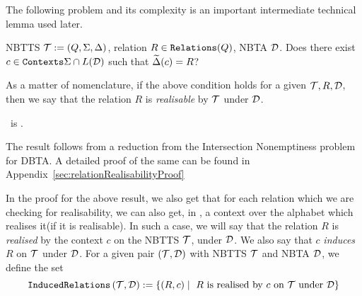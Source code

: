 The following problem and its complexity is an important intermediate technical lemma used later.

\probdef{\relationRealisabilityFull}{\relationRealisabilityShort}
{NBTTS $\mathcal{T} := (Q, \Sigma, \Delta)$, relation $R \in \texttt{Relations}(Q)$, NBTA $\mathcal{D}$.}
{Does there exist $c \in \texttt{Contexts}{\Sigma}{} \cap L(\mathcal{D})$ such that $\widetilde{\Delta}(c) = R$?}

As a matter of nomenclature, if the above condition holds for a given $\mathcal{T}, R, \mathcal{D}$, then we say that the relation $R$ is \emph{realisable} by $\mathcal{T}$ under $\mathcal{D}$.

\begin{theorem}\label{thm:relationRealisabilityExptc}
    \textsc{\relationRealisabilityFull}\ is \exptc.
\end{theorem}

The result follows from a reduction from the Intersection Nonemptiness problem for DBTA. A detailed proof of the same can be found in Appendix~\ref{sec:relationRealisabilityProof}

In the proof for the above result, we also get that for each relation which we are checking for realisability, we can also get, in \expt, a context over the alphabet which realises it(if it is realisable). In such a case, we will say that the relation $R$ is \emph{realised} by the context $c$ on the NBTTS $\mathcal{T}$, under $\mathcal{D}$. We also say that $c$ \emph{induces} $R$ on $\mathcal{T}$ under $\mathcal{D}$.  For a given pair $(\mathcal{T}, \mathcal{D})$ with NBTTS $\mathcal{T}$ and NBTA $\mathcal{D}$, we define the set
\[ \texttt{InducedRelations}\left(\mathcal{T}, \mathcal{D}\right) := \{(R, c) \mid \mbox{ $R$ is realised by $c$ on $\mathcal{T}$ under $\mathcal{D}$}\} \]